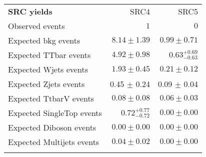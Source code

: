 \begin{table}[!h]
\begin{center}
{\begin{tabular*}{\textwidth}{@{\extracolsep{\fill}}lrr}
\noalign{\smallskip}\hline\noalign{\smallskip}
{\bf SRC yields}           & SRC4            & SRC5              \\[-0.05cm]
\noalign{\smallskip}\hline\noalign{\smallskip}
Observed events          & $1$              & $0$                    \\
\noalign{\smallskip}\hline\noalign{\smallskip}
Expected bkg events         & $8.14 \pm 1.39$          & $0.99 \pm 0.71$              \\
\noalign{\smallskip}\hline\noalign{\smallskip}
        Expected TTbar events         & $4.92 \pm 0.98$          & $0.63_{-0.63}^{+0.69}$              \\
        Expected Wjets events         & $1.93 \pm 0.45$          & $0.21 \pm 0.12$              \\
        Expected Zjets events         & 0.45 $\pm$ 0.24          & 0.09 $\pm$ 0.04             \\
        Expected TtbarV events         & $0.08 \pm 0.08$          & $0.06 \pm 0.03$              \\
        Expected SingleTop events         & $0.72_{-0.72}^{+0.77}$          & $0.00 \pm 0.00$              \\
        Expected Diboson events         & $0.00 \pm 0.00$          & $0.00 \pm 0.00$              \\
        Expected Multijets events         & $0.04 \pm 0.02$          & $0.00 \pm 0.00$              \\
 \noalign{\smallskip}\hline\noalign{\smallskip}
\end{tabular*}

}
\end{center}
\end{table}
%

